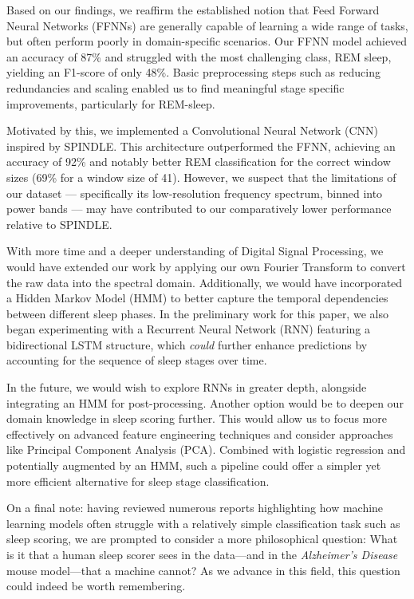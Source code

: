 \documentclass{article}
\begin{document}
\begin{multicols}{2}
Based on our findings, we reaffirm the established notion that Feed Forward Neural Networks (FFNNs) are generally capable of learning a wide range of tasks, but often perform poorly in domain-specific scenarios. Our FFNN model achieved an accuracy of 87\% and struggled with the most challenging class, REM sleep, yielding an F1-score of only 48\%. Basic preprocessing steps such as reducing redundancies and scaling enabled us to find meaningful stage specific improvements, particularly for REM-sleep.

Motivated by this, we implemented a Convolutional Neural Network (CNN) inspired by SPINDLE. This architecture outperformed the FFNN, achieving an accuracy of 92\% and notably better REM classification for the correct window sizes (69\% for a window size of 41). However, we suspect that the limitations of our dataset — specifically its low-resolution frequency spectrum, binned into power bands — may have contributed to our comparatively lower performance relative to SPINDLE.

With more time and a deeper understanding of Digital Signal Processing, we would have extended our work by applying our own Fourier Transform to convert the raw data into the spectral domain. Additionally, we would have incorporated a Hidden Markov Model (HMM) to better capture the temporal dependencies between different sleep phases. In the preliminary work for this paper, we also began experimenting with a Recurrent Neural Network (RNN) featuring a bidirectional LSTM structure, which \textit{could} further enhance predictions by accounting for the sequence of sleep stages over time.

In the future, we would wish to explore RNNs in greater depth, alongside integrating an HMM for post-processing. Another option would be to deepen our domain knowledge in sleep scoring further. This would allow us to focus more effectively on advanced feature engineering techniques and consider approaches like Principal Component Analysis (PCA). Combined with logistic regression and potentially augmented by an HMM, such a pipeline could offer a simpler yet more efficient alternative for sleep stage classification. \cite{van_der_donckt_not_2023} 

On a final note: having reviewed numerous reports highlighting how machine learning models often struggle with a relatively simple classification task such as sleep scoring, we are prompted to consider a more philosophical question: What is it that a human sleep scorer sees in the data—and in the \textit{Alzheimer's Disease} mouse model—that a machine cannot? As we advance in this field, this question could indeed be worth remembering.
\end{multicols}
\end{document}
